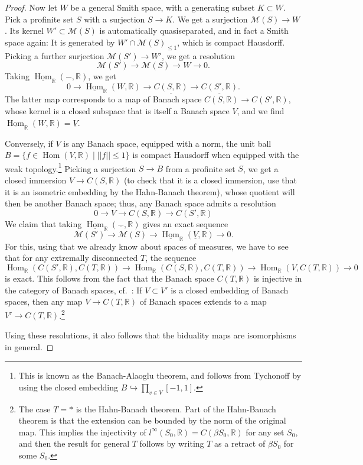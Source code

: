 \documentclass[11pt]{amsbook}
\DeclareMathOperator{\Hom}{Hom}
\newcommand{\intHom}{\underline{\Hom}}
\numberwithin{equation}{section}
\numberwithin{theorem}{section}
\theoremstyle{definition}
\begin{document}
\begin{proof}
Now let $W$ be a general Smith space, with a generating subset $K\subset W$. Pick a profinite set $S$ with a surjection $S\to K$. We get a surjection $\mathcal M(S)\to W$. Its kernel $W'\subset \mathcal M(S)$ is automatically quasiseparated, and in fact a Smith space again: It is generated by $W'\cap \mathcal M(S)_{\leq 1}$, which is compact Hausdorff. Picking a further surjection $\mathcal M(S')\to W'$, we get a resolution
\[
\mathcal M(S')\to \mathcal M(S)\to W\to 0.
\]
Taking $\intHom_{\mathbb R}(-,\mathbb R)$, we get
\[
0\to \intHom_{\mathbb R}(W,\mathbb R)\to \underline{C(S,\mathbb R)}\to \underline{C(S',\mathbb R)} .
\]
The latter map corresponds to a map of Banach space $C(S,\mathbb R)\to C(S',\mathbb R)$, whose kernel is a closed subspace that is itself a Banach space $V$, and we find $\intHom_{\mathbb R}(W,\mathbb R)=\underline{V}$.

Conversely, if $V$ is any Banach space, equipped with a norm, the unit ball $B=\{f\in \Hom(V,\mathbb R)\mid ||f||\leq 1\}$ is compact Hausdorff when equipped with the weak topology.\footnote{This is known as the Banach-Alaoglu theorem, and follows from Tychonoff by using the closed embedding $B\hookrightarrow \prod_{v\in V} [-1,1]$.} Picking a surjection $S\to B$ from a profinite set $S$, we get a closed immersion $V\to C(S,\mathbb R)$ (to check that it is a closed immersion, use that it is an isometric embedding by the Hahn-Banach theorem), whose quotient will then be another Banach space; thus, any Banach space admits a resolution
\[
0\to V\to C(S,\mathbb R)\to C(S',\mathbb R)
\]
We claim that taking $\intHom_{\mathbb R}(\underline{-},\mathbb R)$ gives an exact sequence
\[
\mathcal M(S')\to \mathcal M(S)\to \intHom_{\mathbb R}(\underline{V},\mathbb R)\to 0.
\]
For this, using that we already know about spaces of measures, we have to see that for any extremally disconnected $T$, the sequence
\[
\Hom_{\mathbb R}(C(S',\mathbb R),C(T,\mathbb R))\to \Hom_{\mathbb R}(C(S,\mathbb R),C(T,\mathbb R))\to \Hom_{\mathbb R}(V,C(T,\mathbb R))\to 0
\]
is exact. This follows from the fact that the Banach space $C(T,\mathbb R)$ is injective in the category of Banach spaces, cf.~\cite[Section 1.3]{SepInjBanach}: If $V\subset V'$ is a closed embedding of Banach spaces, then any map $V\to C(T,\mathbb R)$ of Banach spaces extends to a map $V'\to C(T,\mathbb R)$.\footnote{The case $T=\ast$ is the Hahn-Banach theorem. Part of the Hahn-Banach theorem is that the extension can be bounded by the norm of the original map. This implies the injectivity of $l^\infty(S_0,\mathbb R)=C(\beta S_0,\mathbb R)$ for any set $S_0$, and then the result for general $T$ follows by writing $T$ as a retract of $\beta S_0$ for some $S_0$.}

Using these resolutions, it also follows that the biduality maps are isomorphisms in general.
\end{proof}
\end{document}
